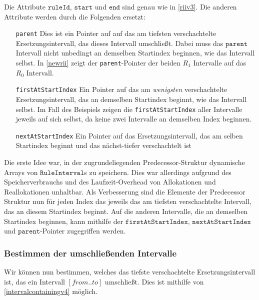 Die Attribute $\texttt{ruleId}$, $\texttt{start}$ und $\texttt{end}$ sind genau wie in \autoref{riiv3}. Die anderen Attribute werden durch die Folgenden ersetzt:

\begin{itemize}[leftmargin=3cm]
    \item[\texttt{parent}] Dies ist ein Pointer auf auf das am tiefsten verschachtelte Ersetzungsintervall, das dieses Intervall umschließt. Dabei muss das $\texttt{parent}$ Intervall nicht unbedingt an demselben Startindex beginnen, wie das Intervall selbst. In \autoref{newrii} zeigt der \texttt{parent}-Pointer der beiden $R_1$ Intervalle auf das $R_0$ Intervall.
    \item[\texttt{firstAtStartIndex}] Ein Pointer auf das am \emph{wenigsten} verschachtelte Ersetzungsintervall, das an demselben Startindex beginnt, wie das Intervall selbst. Im Fall des Beispiels zeigen die \texttt{firstAtStartIndex} aller Intervalle jeweils auf sich selbst, da keine zwei Intervalle an demselben Index beginnen.
    \item[\texttt{nextAtStartIndex}] Ein Pointer auf das Ersetzungsintervall, das am selben Startindex beginnt und das nächst-tiefer verschachtelt ist
\end{itemize}

Die erste Idee war, in der zugrundeliegenden Predecessor-Struktur dynamische Arrays von $\texttt{RuleInterval}$s zu speichern. Dies war allerdings aufgrund des Speicherverbrauchs und des Laufzeit-Overhead von Allokationen und Reallokationen unhaltbar. Als Verbesserung sind die Elemente der Predecessor Struktur nun für jeden Index das jeweils das am tiefsten verschachtelte Intervall, das an diesem Startindex beginnt. Auf die anderen Intervalle, die an demselben Startindex beginnen, kann mithilfe der $\texttt{firstAtStartIndex}$, $\texttt{nextAtStartIndex}$ und $\texttt{parent}$-Pointer zugegriffen werden.

\subsubsection{Bestimmen der umschließenden Intervalle}

Wir können nun bestimmen, welches das tiefste verschachtelte Ersetzungsintervall ist, das ein Intervall $[from..to]$ umschließt.
Dies ist mithilfe von \autoref{intervalcontainingv4} möglich.

